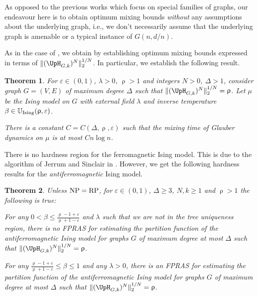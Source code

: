 \documentclass[11pt,reqno]{amsart}
\numberwithin{equation}{section}
\newtheorem{theorem}{Theorem}[section]
\newcommand{\bluepigment}[1]{{\color{blue(pigment)}#1}}
\newcommand{\cadmiumgreen}[1]{{\color{cadmiumgreen}#1}}
\newcommand{\goldenbrown}[1]{{\color{goldenbrown}#1}}
\newcommand{\maxDeg}{{\Delta}}
\newcommand{\UnIsing}{{\mathbb{U}_{\rm Ising}}}
\newcommand{\nnorm}[3]{\goldenbrown{\|} #1\goldenbrown{\|}^{#2}_{#3}}
\newcommand{\NBMatrix}{\cadmiumgreen{\UpH}_{G,\kk}}
\renewcommand{\bluepigment}[1]{#1}
\renewcommand{\cadmiumgreen}[1]{#1}
\renewcommand{\goldenbrown}[1]{#1}
\newcommand{\kk}{\bluepigment{k}}
\renewcommand{\kk}{k}
\newcommand{\SingBound}{\uprho}
\begin{document}
As opposed to the previous works  which focus on  special families of graphs, our endeavour  here is to obtain 
optimum mixing bounds    {\em without} any assumptions about the underlying graph, i.e., we don't necessarily assume that
the underlying graph is amenable or a typical instance of $G(n,d/n)$. 



As in the case of , we obtain  by establishing  
optimum mixing bounds expressed in terms of  $\nnorm{ (\NBMatrix)^N}{1/N}{2}$. In particular, we establish the following result.




\begin{theorem}\label{thrm:Ising4SPRadiusHash}
For $\varepsilon\in (0,1)$, $\lambda>0$, $\SingBound>1$ and integers $N>0$, $\maxDeg>1$, 
consider graph $G=(V,E)$ of maximum degree $\maxDeg$ such that $\nnorm{ (\NBMatrix)^N}{1/N}{2} =\SingBound$.
%
Let $\mu$ be the Ising model on $G$ with external field $\lambda$ and inverse temperature $\beta\in \UnIsing({\SingBound},\varepsilon)$. 

There is a constant {$C={C(\maxDeg, {\SingBound}, \varepsilon)}$} such that the mixing time of Glauber dynamics 
on $\mu$ is at most $C n\log n$. 
\end{theorem}


There is no hardness region for the ferromagnetic Ising model. This is due to the algorithm of 
Jerrum and Sinclair in \cite{JerSincIsing93}. However, we get the following hardness results   for the {\em antiferromagnetic} Ising model. 




\begin{theorem}\label{thrm:HarndessTransIsingNBM}
Unless ${\rm NP} = {\rm RP}$, for $\varepsilon\in (0,1)$, $\maxDeg\geq 3$, $N, k\geq 1$ and $\SingBound > 1$ 
the following is true:

For any $0<\beta \leq \frac{\SingBound-1+\varepsilon}{\SingBound+1-\varepsilon}$ and $\lambda$ such that
we are not in the tree uniqueness region, there is no FPRAS for estimating 
the partition function of the {\em antiferromagnetic} Ising model
for graphs $G$ of maximum degree at most $\maxDeg$ such that $\nnorm{ (\NBMatrix)^N}{1/N}{2}=\SingBound$.


For any $\frac{\SingBound-1+\varepsilon}{\SingBound+1-\varepsilon}\leq \beta\leq 1 $ and any $\lambda>0$,
there is an FPRAS for estimating the partition function of the {\em antiferromagnetic} Ising model
for graphs $G$ of maximum degree at most $\maxDeg$ such that $\nnorm{ (\NBMatrix)^N}{1/N}{2}=\SingBound$.
\end{theorem}
\end{document}
